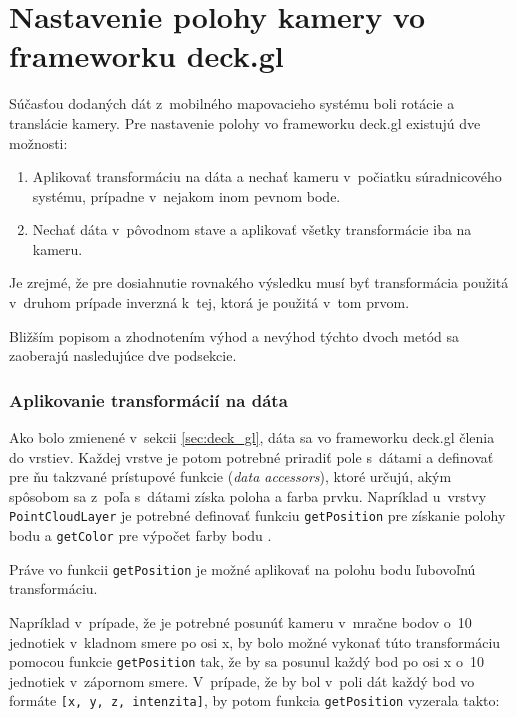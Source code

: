 \section{Nastavenie polohy kamery vo frameworku deck.gl}
\label{sec:nastavenie_polohy_kamery}

Súčasťou dodaných dát z~mobilného mapovacieho systému boli rotácie a translácie kamery. Pre nastavenie polohy vo frameworku deck.gl existujú dve možnosti:

\begin{enumerate}
    \item Aplikovať transformáciu na dáta a nechať kameru v~počiatku súradnicového systému, prípadne v~nejakom inom pevnom bode.
    \item Nechať dáta v~pôvodnom stave a aplikovať všetky transformácie iba na kameru.
\end{enumerate}

Je zrejmé, že pre dosiahnutie rovnakého výsledku musí byť transformácia použitá v~druhom prípade inverzná k~tej, ktorá je použitá v~tom prvom.

Bližším popisom a zhodnotením výhod a nevýhod týchto dvoch metód sa zaoberajú nasledujúce dve podsekcie.

\subsubsection{Aplikovanie transformácií na dáta}

Ako bolo zmienené v~sekcii \ref{sec:deck_gl}, dáta sa vo frameworku deck.gl členia do vrstiev. Každej vrstve je potom potrebné priradiť pole s~dátami a definovať pre ňu takzvané prístupové funkcie (\emph{data accessors}), ktoré určujú, akým spôsobom sa z~poľa s~dátami získa poloha a farba prvku. Napríklad u~vrstvy \texttt{PointCloudLayer} je potrebné definovať funkciu \texttt{getPosition} pre získanie polohy bodu a \texttt{getColor} pre výpočet farby bodu \cite{deck.gl_documentation}.

Práve vo funkcii \texttt{getPosition} je možné aplikovať na polohu bodu ľubovoľnú transformáciu.

Napríklad v~prípade, že je potrebné posunúť kameru v~mračne bodov o~10 jednotiek v~kladnom smere po osi x, by bolo možné vykonať túto transformáciu pomocou funkcie \texttt{getPosition} tak, že by sa posunul každý bod po osi x o~10 jednotiek v~zápornom smere. V~prípade, že by bol v~poli dát každý bod vo formáte \texttt{[x, y, z, intenzita]}, by potom funkcia \texttt{getPosition} vyzerala takto:

